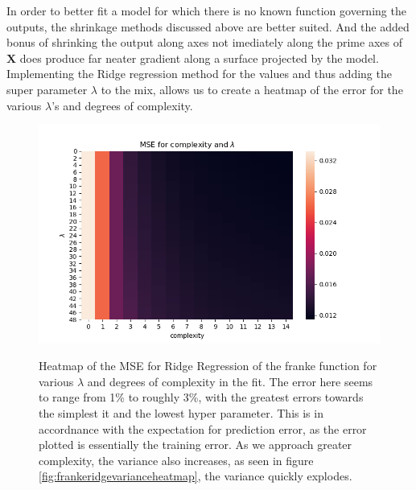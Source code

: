 \documentclass[ 12pt, a4paper ]{article}
\begin{document}
In order to better fit a model for which there is no known function governing the outputs, 
the shrinkage methods discussed above are better suited. And the added bonus of shrinking the
output along axes not imediately along the prime axes of $\mathbf{X}$ does produce far neater 
gradient along a surface projected by the model. Implementing the Ridge regression method for 
the values and thus adding the super parameter $\lambda$ to the mix, allows us to create a 
heatmap of the error for the various $\lambda$'s and degrees of complexity.

\begin{figure}
\includegraphics[scale=0.7]{frankeridgemseheatmap.png}
\label{fig:frankeridgemseheatmap}
\caption{
    Heatmap of the MSE for Ridge Regression of the franke function for various $\lambda$ and 
    degrees of complexity in the fit. The error here seems to range from 1\% to roughly 3\%, 
    with the greatest errors towards the simplest it and the lowest hyper parameter. This is 
    in accordnance with the expectation for prediction error, as the error plotted is essentially
    the training error. As we approach greater complexity, the variance also increases, as seen
    in figure \ref{fig:frankeridgevarianceheatmap}, the variance quickly explodes. 
}
\end{figure}
\end{document}
